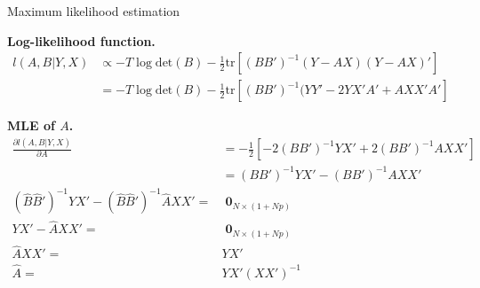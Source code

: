\documentclass[notes,blackandwhite,mathsans,usenames,dvipsnames]{beamer}
\begin{document}
\begin{frame}{Maximum likelihood estimation}

\bigskip\textbf{Log-likelihood function.}\footnotesize
\begin{align*}
l(A,B|Y,X) &\propto -T\log\text{det}\left( B\right)  -\frac{1}{2}\text{tr}\left[ (BB')^{-1}(Y-AX)(Y-AX)' \right]\\
&= -T\log\text{det}\left( B\right)  -\frac{1}{2}\text{tr}\left[ (BB')^{-1}(YY' -2YX'A' + AXX'A' \right]
\end{align*}


\normalsize
\bigskip\textbf{MLE of $A$.}\footnotesize
\begin{align*}
\frac{\partial l(A,B|Y,X)}{\partial A} &=-\frac{1}{2}\left[ -2(BB')^{-1}YX' + 2(BB')^{-1}AXX' \right]\\
&=(BB')^{-1}YX' -(BB')^{-1}AXX'\\[3ex]
(\widehat{B}\widehat{B}')^{-1}YX' -(\widehat{B}\widehat{B}')^{-1}\widehat{A}XX' =&\; \mathbf{0}_{N\times (1+Np)}\\
YX' -\widehat{A}XX' =&\; \mathbf{0}_{N\times (1+Np)}\\
\widehat{A}XX' =& YX'  \\
\widehat{A} =& YX' (XX')^{-1}
\end{align*}

\end{frame}
\end{document}
